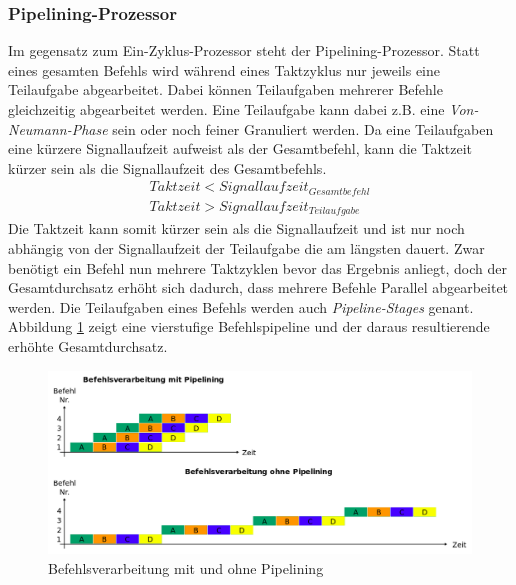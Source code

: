             \subsubsection{Pipelining-Prozessor}
                Im gegensatz zum Ein-Zyklus-Prozessor steht der Pipelining-Prozessor.
                Statt eines gesamten Befehls wird während eines Taktzyklus nur jeweils eine Teilaufgabe abgearbeitet.
                Dabei können Teilaufgaben mehrerer Befehle gleichzeitig abgearbeitet werden.
                Eine Teilaufgabe kann dabei z.B. eine \textit{Von-Neumann-Phase} sein oder noch feiner Granuliert werden.
                Da eine Teilaufgaben eine kürzere Signallaufzeit aufweist als der Gesamtbefehl,
                kann die Taktzeit kürzer sein als die Signallaufzeit des Gesamtbefehls.
                \begin{equation}
                    \begin{split}
                        Taktzeit < Signallaufzeit_{Gesamtbefehl} \\
                        Taktzeit > Signallaufzeit_{Teilaufgabe}
                    \end{split}
                \end{equation}
                Die Taktzeit kann somit kürzer sein als die Signallaufzeit und ist nur noch abhängig von
                der Signallaufzeit der Teilaufgabe die am längsten dauert.
                Zwar benötigt ein Befehl nun mehrere Taktzyklen bevor das Ergebnis anliegt,
                doch der Gesamtdurchsatz erhöht sich dadurch, dass mehrere Befehle Parallel abgearbeitet werden.
                Die Teilaufgaben eines Befehls werden auch \textit{Pipeline-Stages} genant.
                Abbildung \ref{fig:pipelining} zeigt eine vierstufige Befehlspipeline und der daraus resultierende erhöhte Gesamtdurchsatz.

            \begin{figure}[H]
                \centering
                \includegraphics[scale=0.375]{img/pipelining.png}
                \caption[Befehlsverarbeitung mit und ohne Pipelining]{Befehlsverarbeitung mit und ohne Pipelining \cite{pipelining} }
                \label{fig:pipelining}
            \end{figure}

